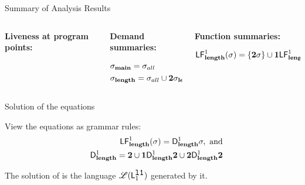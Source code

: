 \documentclass[xcolor=x11names,compress,mathserif]{beamer}
\renewcommand{\(}{\begin{columns}}
\renewcommand{\)}{\end{columns}}
\newcommand{\<}[1]{\begin{column}{#1}}
\renewcommand{\>}{\end{column}}
\begin{document}
\begin{frame}[t]{Summary of Analysis Results}
  \scriptsize
  \begin{columns}[c]
    \begin{column}[T]{0.33\textwidth}
      \vspace*{1.5cm}
      \centerline{\bf Liveness at program points:}
      \begin{align*}
      \end{align*}
    \end{column}
    
    \begin{column}[T]{0.33\textwidth}
      \vspace*{1.5cm}
      \centerline{\bf Demand summaries:}
      \begin{align*}
        &\sigma_{\mathbf{main}} = \sigma_{all}\\
        &\sigma_{\mathbf{length}} = \sigma_{all} \cup {\mathbf{2}}\sigma_{\mathbf{length}}
      \end{align*}
    \end{column}
    
    \begin{column}[T]{0.33\textwidth}
      \vspace*{1.5cm}
      \centerline{\bf Function summaries:}
      \begin{align*}
        \mathsf{LF}_{\mathit {\mathbf{length}}}^{1}( {\mathit \sigma}) = \{{\mathbf{2}}\sigma\} \cup \mathbf{1}\mathsf{LF}_{\mathit {\mathbf{length}}}^{1}( {\mathit {{\mathbf{2}}}\sigma})
      \end{align*}
    \end{column}
  \end{columns}
\end{frame}

\begin{frame}{Solution of the equations}

  View the equations as grammar rules:
 \begin{eqnarray*}
&&  \mathsf{LF}_{\mathit {\mathbf{length}} }^{1}( {\mathit \sigma}) = \mathsf{D}_{\mathit {\mathbf{length}}}^{1}\sigma,~\mbox{and}\\
&&   \mathsf{D}_{\mathit {\mathbf{length}}}^{1} = {\mathbf{2}} \cup \mathbf{1}\mathsf{D}_{\mathit {\mathbf{length}}}^{1}{\mathbf{2}}
       \cup {\mathbf{2}}\mathsf{D}_{\mathit {\mathbf{length}}}^{1}{{\mathbf{2}}}
 \end{eqnarray*}

The  solution of  is the   language  $\mathscr{L}(\mathsf{L}_{{1}}^{\mbox{\tt l1}})$ generated    by    it.
\end{frame}
\end{document}
